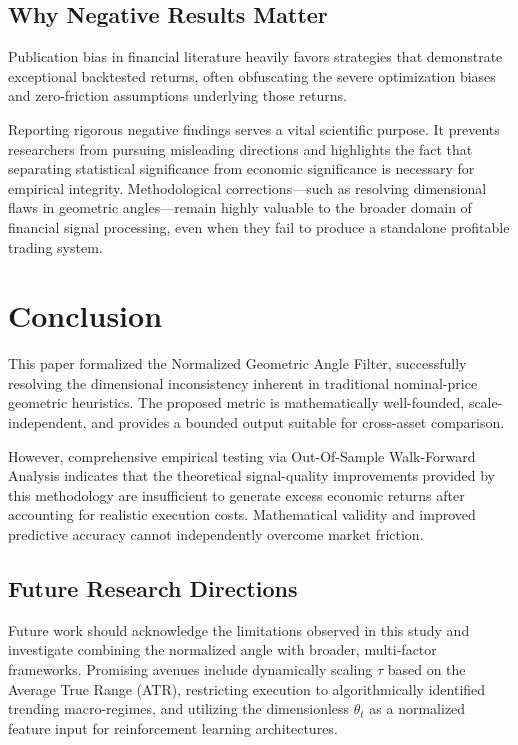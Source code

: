 \documentclass[conference]{IEEEtran}
\begin{document}
\subsection{Why Negative Results Matter}
Publication bias in financial literature heavily favors strategies that demonstrate exceptional backtested returns, often obfuscating the severe optimization biases and zero-friction assumptions underlying those returns. 

Reporting rigorous negative findings serves a vital scientific purpose. It prevents researchers from pursuing misleading directions and highlights the fact that separating statistical significance from economic significance is necessary for empirical integrity. Methodological corrections---such as resolving dimensional flaws in geometric angles---remain highly valuable to the broader domain of financial signal processing, even when they fail to produce a standalone profitable trading system.

\section{Conclusion}
This paper formalized the Normalized Geometric Angle Filter, successfully resolving the dimensional inconsistency inherent in traditional nominal-price geometric heuristics. The proposed metric is mathematically well-founded, scale-independent, and provides a bounded output suitable for cross-asset comparison.

However, comprehensive empirical testing via Out-Of-Sample Walk-Forward Analysis indicates that the theoretical signal-quality improvements provided by this methodology are insufficient to generate excess economic returns after accounting for realistic execution costs. Mathematical validity and improved predictive accuracy cannot independently overcome market friction.

\subsection{Future Research Directions}
Future work should acknowledge the limitations observed in this study and investigate combining the normalized angle with broader, multi-factor frameworks. Promising avenues include dynamically scaling $\tau$ based on the Average True Range (ATR), restricting execution to algorithmically identified trending macro-regimes, and utilizing the dimensionless $\theta_t$ as a normalized feature input for reinforcement learning architectures.
\end{document}
